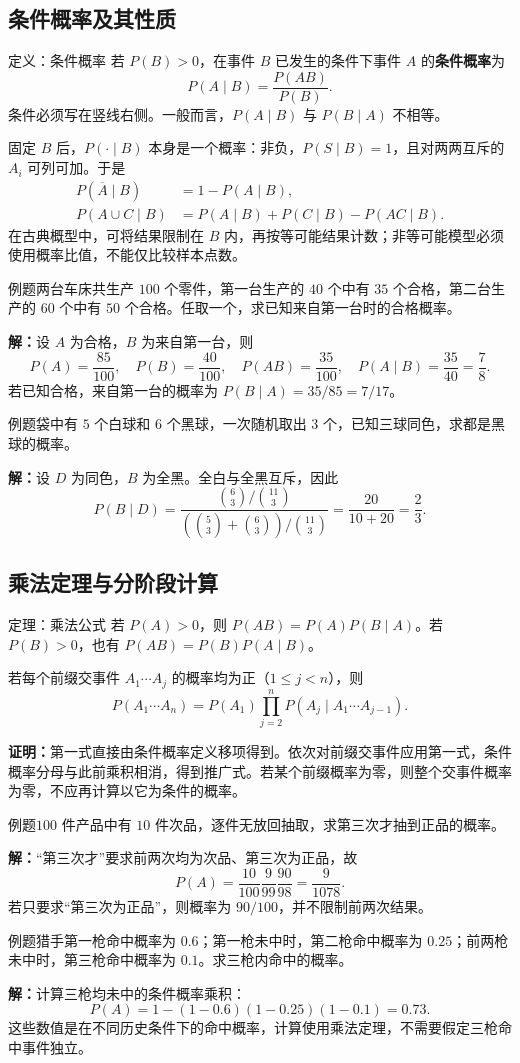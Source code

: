 \documentclass[UTF8,fontset=none,zihao=-4,a4paper]{ctexart}
\newcommand{\term}[1]{\textbf{#1}}
\newcommand{\example}[1]{\begin{infobox}{例题}#1\end{infobox}}
\newcommand{\solution}{\par\noindent\textbf{解：}}
\newcommand{\proof}{\par\noindent\textbf{证明：}}
\newcommand{\com}[2]{\binom{#1}{#2}}
\begin{document}
\subsection{条件概率及其性质}
\begin{infobox}{定义：条件概率}
若 $P(B)>0$，在事件 $B$ 已发生的条件下事件 $A$ 的\term{条件概率}为
\[
P(A\mid B)=\frac{P(AB)}{P(B)}.
\]
条件必须写在竖线右侧。一般而言，$P(A\mid B)$ 与 $P(B\mid A)$ 不相等。
\end{infobox}
固定 $B$ 后，$P(\cdot\mid B)$ 本身是一个概率：非负，$P(S\mid B)=1$，且对两两互斥的 $A_i$ 可列可加。于是
\begin{align*}
P(\overline A\mid B)&=1-P(A\mid B),\\
P(A\cup C\mid B)&=P(A\mid B)+P(C\mid B)-P(AC\mid B).
\end{align*}
在古典概型中，可将结果限制在 $B$ 内，再按等可能结果计数；非等可能模型必须使用概率比值，不能仅比较样本点数。
\example{两台车床共生产 $100$ 个零件，第一台生产的 $40$ 个中有 $35$ 个合格，第二台生产的 $60$ 个中有 $50$ 个合格。任取一个，求已知来自第一台时的合格概率。}
\solution 设 $A$ 为合格，$B$ 为来自第一台，则
\[
P(A)=\frac{85}{100},\quad P(B)=\frac{40}{100},\quad
P(AB)=\frac{35}{100},\quad P(A\mid B)=\frac{35}{40}=\frac78.
\]
若已知合格，来自第一台的概率为 $P(B\mid A)=35/85=7/17$。
\example{袋中有 $5$ 个白球和 $6$ 个黑球，一次随机取出 $3$ 个，已知三球同色，求都是黑球的概率。}
\solution 设 $D$ 为同色，$B$ 为全黑。全白与全黑互斥，因此
\[
P(B\mid D)=\frac{\com63/\com{11}3}{(\com53+\com63)/\com{11}3}
=\frac{20}{10+20}=\frac23.
\]
\subsection{乘法定理与分阶段计算}
\begin{infobox}{定理：乘法公式}
若 $P(A)>0$，则 $P(AB)=P(A)P(B\mid A)$。若 $P(B)>0$，也有 $P(AB)=P(B)P(A\mid B)$。

若每个前缀交事件 $A_1\cdots A_j$ 的概率均为正（$1\le j<n$），则
\[
P(A_1\cdots A_n)=P(A_1)\prod_{j=2}^{n}P(A_j\mid A_1\cdots A_{j-1}).
\]
\end{infobox}
\proof 第一式直接由条件概率定义移项得到。依次对前缀交事件应用第一式，条件概率分母与此前乘积相消，得到推广式。若某个前缀概率为零，则整个交事件概率为零，不应再计算以它为条件的概率。
\example{$100$ 件产品中有 $10$ 件次品，逐件无放回抽取，求第三次才抽到正品的概率。}
\solution “第三次才”要求前两次均为次品、第三次为正品，故
\[
P(A)=\frac{10}{100}\frac9{99}\frac{90}{98}=\frac9{1078}.
\]
若只要求“第三次为正品”，则概率为 $90/100$，并不限制前两次结果。
\example{猎手第一枪命中概率为 $0.6$；第一枪未中时，第二枪命中概率为 $0.25$；前两枪未中时，第三枪命中概率为 $0.1$。求三枪内命中的概率。}
\solution 计算三枪均未中的条件概率乘积：
\[
P(A)=1-(1-0.6)(1-0.25)(1-0.1)=0.73.
\]
这些数值是在不同历史条件下的命中概率，计算使用乘法定理，不需要假定三枪命中事件独立。
\end{document}
